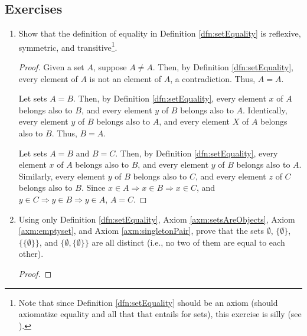 \documentclass[../main.tex]{subfiles}
\begin{document}
\subsection*{Exercises}
\begin{enumerate}[ref={\thesection.\arabic*}]
    \item \label{exr:3.1.1}Show that the definition of equality in Definition \ref{dfn:setEquality} is reflexive, symmetric, and transitive\footnote{Note that since Definition \ref{dfn:setEquality} should be an axiom (should axiomatize equality and all that that entails for sets), this exercise is silly (see \cite{bib:TaoErrata}).}.
    \begin{proof}
        Given a set $A$, suppose $A\neq A$. Then, by Definition \ref{dfn:setEquality}, every element of $A$ is not an element of $A$, a contradiction. Thus, $A=A$.\par
        Let sets $A=B$. Then, by Definition \ref{dfn:setEquality}, every element $x$ of $A$ belongs also to $B$, and every element $y$ of $B$ belongs also to $A$. Identically, every element $y$ of $B$ belongs also to $A$, and every element $X$ of $A$ belongs also to $B$. Thus, $B=A$.\par
        Let sets $A=B$ and $B=C$. Then, by Definition \ref{dfn:setEquality}, every element $x$ of $A$ belongs also to $B$, and every element $y$ of $B$ belongs also to $A$. Similarly, every element $y$ of $B$ belongs also to $C$, and every element $z$ of $C$ belongs also to $B$. Since $x\in A\Rightarrow x\in B\Rightarrow x\in C$, and $y\in C\Rightarrow y\in B\Rightarrow y\in A$, $A=C$.
    \end{proof}
    \item \label{exr:3.1.2}Using only Definition \ref{dfn:setEquality}, Axiom \ref{axm:setsAreObjects}, Axiom \ref{axm:emptyset}, and Axiom \ref{axm:singletonPair}, prove that the sets $\emptyset$, $\{\emptyset\}$, $\{\{\emptyset\}\}$, and $\{\emptyset,\{\emptyset\}\}$ are all distinct (i.e., no two of them are equal to each other).
    \begin{proof}

\end{proof}
\end{enumerate}
\end{document}
